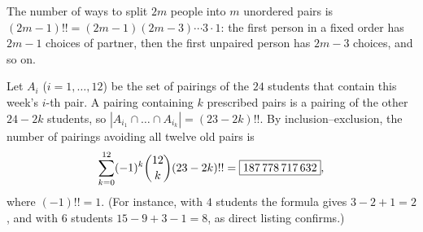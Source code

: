 The number of ways to split $2m$ people into $m$ unordered pairs is $(2m-1)!!=(2m-1)(2m-3)\cdots3\cdot1$: the first person in a fixed order has $2m-1$ choices of partner, then the first unpaired person has $2m-3$ choices, and so on.

Let $A_i$ ($i=1,\dots,12$) be the set of pairings of the $24$ students that contain this week's $i$-th pair. A pairing containing $k$ prescribed pairs is a pairing of the other $24-2k$ students, so $|A_{i_1}\cap\dots\cap A_{i_k}|=(23-2k)!!$. By inclusion--exclusion, the number of pairings avoiding all twelve old pairs is
\[
\sum_{k=0}^{12}(-1)^k\dbinom{12}{k}(23-2k)!!=\boxed{187\,778\,717\,632},
\]
where $(-1)!!=1$. (For instance, with $4$ students the formula gives $3-2+1=2$, and with $6$ students $15-9+3-1=8$, as direct listing confirms.)
